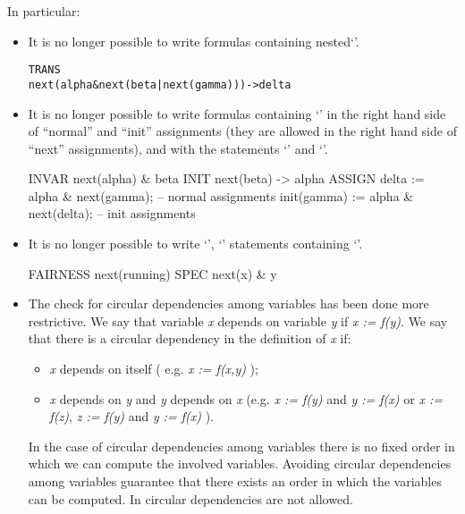 In particular:

\begin{itemize}

\item It is no longer possible to write formulas containing
      nested`'.
\begin{alltt}
TRANS
  next(alpha & next(beta | next(gamma))) -> delta
\end{alltt}

\item It is no longer possible to write formulas containing
      `' in the right hand side of ``normal'' and ``init''
      assignments (they are allowed in the right hand side of ``next''
      assignments), and with the statements `' and
      `'.

\begin{nusmvCode}
INVAR
  next(alpha) & beta
INIT
  next(beta) -> alpha
ASSIGN
  delta := alpha & next(gamma);       -- normal assignments
  init(gamma) := alpha & next(delta); -- init assignments
\end{nusmvCode}

\item It is no longer possible to write `',
      `' statements containing `'.

\begin{nusmvCode}
FAIRNESS
 next(running)
SPEC
 next(x) & y
\end{nusmvCode}

\item The check for circular dependencies among variables has been 
      done more restrictive.  We say that variable \textit{x} depends on
      variable \textit{y} if \textit{x := f(y)}.  We say that there is a
      circular dependency in the definition of \textit{x} if:

\begin{itemize}
  \item  \textit{x} depends on itself ( e.g. \textit{x := f(x,y)} );
  \item \textit{x} depends on \textit{y} and \textit{y} depends on
        \textit{x} (e.g. \textit{x := f(y)} and \textit{y := f(x)} or
        \textit{x := f(z)}, \textit{z := f(y)} and \textit{y := f(x)} ).
\end{itemize}
%
In the case of circular dependencies among variables there is no fixed
order in which we can compute the involved variables. Avoiding
circular dependencies among variables guarantee that there exists an
order in which the variables can be computed. In \nusmv circular
dependencies are not allowed.


\end{itemize}
